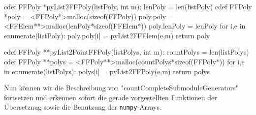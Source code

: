 \begin{sagecode}[caption={Aus \url{../Sage/enumeratePCNs.spyx}},
  firstnumber=70]
cdef FFPoly *pyList2FFPoly(listPoly, int m):
    lenPoly = len(listPoly)
    cdef FFPoly *poly = <FFPoly*>malloc(sizeof(FFPoly))
    poly.poly = <FFElem**>malloc(lenPoly*sizeof(FFElem*))
    poly.lenPoly = lenPoly
    for i,e in enumerate(listPoly):
        poly.poly[i] = pyList2FFElem(e,m)
    return poly
\end{sagecode}

\begin{sagecode}[caption={Aus \url{../Sage/enumeratePCNs.spyx}},
  firstnumber=79]
cdef FFPoly **pyList2PointFFPoly(listPolys, int m):
    countPolys = len(listPolys)
    cdef FFPoly **polys = <FFPoly**>malloc(countPolys*sizeof(FFPoly*))
    for i,e in enumerate(listPolys):
        polys[i] = pyList2FFPoly(e,m)
    return polys
\end{sagecode}


Nun können wir die Beschreibung von "countCompleteSubmoduleGenerators"
fortsetzen und erkennen sofort die gerade vorgestellten Funktionen der
Übersetznug sowie die Benutzung der \texttt{numpy}-Arrays.

